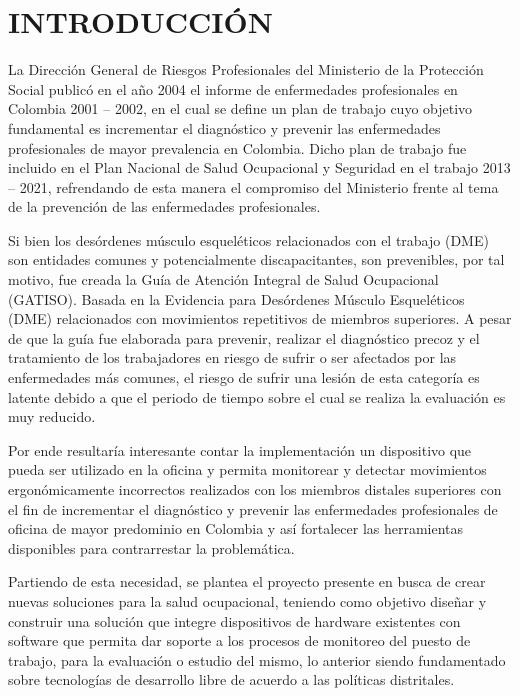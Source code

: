 \newpage
\chapter{INTRODUCCIÓN} 
La Dirección General de Riesgos Profesionales del Ministerio de la Protección Social publicó en el año 2004 el informe de enfermedades profesionales en Colombia 2001 – 2002, en el cual se define un plan de trabajo cuyo objetivo fundamental es incrementar el diagnóstico y prevenir las enfermedades profesionales de mayor prevalencia en Colombia. Dicho plan de trabajo fue incluido en el Plan Nacional de Salud Ocupacional y Seguridad en el trabajo 2013 – 2021, refrendando de esta manera el compromiso del Ministerio frente al tema de la prevención de las enfermedades profesionales.

Si bien los desórdenes músculo esqueléticos relacionados con el trabajo (DME) son entidades comunes y potencialmente discapacitantes, son prevenibles, por tal motivo, fue creada la Guía de Atención Integral de Salud Ocupacional (GATISO). Basada en la Evidencia para Desórdenes Músculo Esqueléticos (DME) relacionados con movimientos repetitivos de miembros superiores. A pesar de que la guía fue elaborada para prevenir, realizar el diagnóstico precoz y el tratamiento de los trabajadores en riesgo de sufrir o ser afectados por las enfermedades más comunes, el riesgo de sufrir una lesión de esta categoría es latente debido a que el periodo de tiempo sobre el cual se realiza la evaluación es muy reducido.

Por ende resultaría interesante contar la implementación un dispositivo que pueda ser utilizado en la oficina y permita monitorear y detectar movimientos ergonómicamente incorrectos realizados con los miembros distales superiores con el fin de incrementar el diagnóstico y prevenir las enfermedades profesionales de oficina de mayor predominio en Colombia y así fortalecer las herramientas disponibles para contrarrestar la problemática.

Partiendo de esta necesidad, se plantea el proyecto presente en busca de crear nuevas soluciones para la salud ocupacional, teniendo como objetivo diseñar y construir una solución que integre dispositivos de hardware existentes con software que permita dar soporte a los procesos de monitoreo del puesto de trabajo, para la evaluación o estudio del mismo, lo anterior siendo fundamentado sobre tecnologías de desarrollo libre de acuerdo a las políticas distritales.